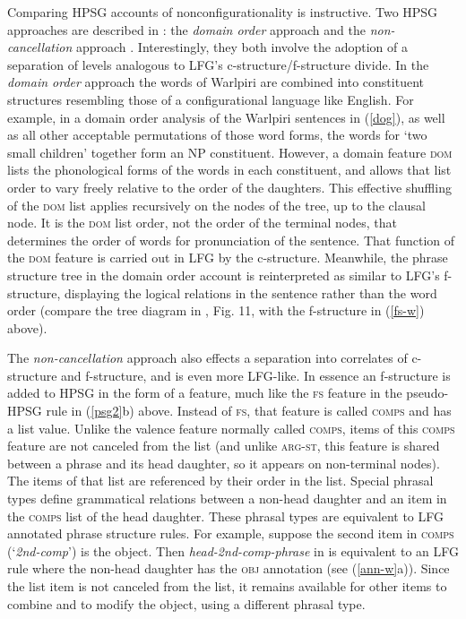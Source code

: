 Comparing HPSG accounts of nonconfigurationality is instructive.   Two HPSG approaches are described in : the \emph{domain order} approach \citep{DS99a} and the \emph{non-cancellation} approach \citep{Bender2008a}. Interestingly, they both involve the adoption of a separation of levels analogous to LFG's c-structure/f-structure divide.
In the \emph{domain order}  approach the words of Warlpiri are combined into constituent structures resembling those of a configurational language like English.  For example, in a domain order analysis of the Warlpiri sentences in (\ref{dog}), as well as all other acceptable permutations of those word forms, the words for `two small children' together form an NP constituent.  However, a domain feature \textsc{dom} lists the phonological forms of the words in each constituent, and allows that list order to vary freely relative to the order of the daughters.  This effective shuffling of the \textsc{dom} list applies recursively on the nodes of the tree, up to the clausal node.  It is the \textsc{dom} list order, not the order of the terminal nodes, that determines the order of words for  pronunciation of the sentence.  That function of the \textsc{dom} feature is carried out in LFG by the c-structure.    Meanwhile, the phrase structure tree in the domain order account is reinterpreted as similar to LFG's f-structure, displaying the logical relations in the sentence rather than the word order (compare the tree diagram in , Fig. 11, with the f-structure in (\ref{fs-w}) above).  

The \textit{non-cancellation}  approach also effects a separation into correlates of c-structure and f-structure, and is even more LFG-like.  In essence an f-structure is added to HPSG in the form of a feature, much like the \textsc{fs} feature in the pseudo-HPSG rule in (\ref{psg2}b) above.  Instead of \textsc{fs}, that feature is called \textsc{comps} and has a list value.  Unlike the valence feature normally called \textsc{comps}, items of this \textsc{comps} feature are not canceled from the list (and unlike \textsc{arg-st}, this feature is shared between a phrase and its head daughter, so it appears on non-terminal nodes).  The items of that list are referenced by their order in the list.  Special phrasal types define grammatical relations between a non-head daughter and an item in the \textsc{comps} list of the head daughter.  These phrasal types are equivalent to LFG annotated phrase structure rules.  For example, suppose the second item in \textsc{comps} (`\textit{2nd-comp}') is the object.  Then \textit{head-2nd-comp-phrase} in \citet[12]{Bender2008a} is equivalent to an LFG rule where the non-head daughter has the \textsc{obj} annotation (see (\ref{ann-w}a)).  Since the list item is not canceled from the list, it remains available for other items to combine and to modify the object, using a different phrasal type.  

